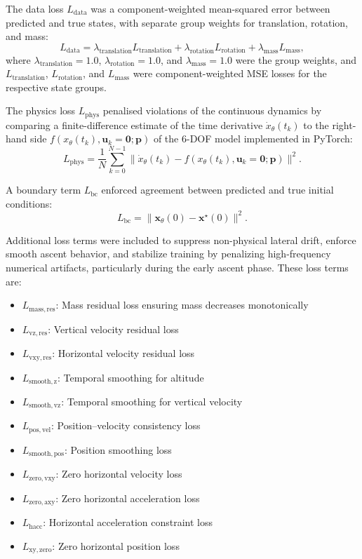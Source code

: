 The data loss \(L_\mathrm{data}\) was a component-weighted mean-squared error
between predicted and true states, with separate group weights for translation,
rotation, and mass:
\[
  L_\mathrm{data} = \lambda_\mathrm{translation} L_\mathrm{translation} +
  \lambda_\mathrm{rotation} L_\mathrm{rotation} +
  \lambda_\mathrm{mass} L_\mathrm{mass},
\]
where \(\lambda_\mathrm{translation} = 1.0\), \(\lambda_\mathrm{rotation} =
1.0\), and \(\lambda_\mathrm{mass} = 1.0\) were the group weights, and
\(L_\mathrm{translation}\), \(L_\mathrm{rotation}\), and \(L_\mathrm{mass}\) were
component-weighted MSE losses for the respective state groups.

The physics loss \(L_\mathrm{phys}\) penalised violations of the continuous
dynamics by comparing a finite-difference estimate of the time derivative
\(\dot{x}_\theta(t_k)\) to the right-hand side \(f(x_\theta(t_k), \mathbf{u}_k =
\mathbf{0}; \mathbf{p})\) of the 6-DOF model implemented in PyTorch:
\[
  L_\mathrm{phys}
  = \frac{1}{N} \sum_{k=0}^{N-1}
    \bigl\|
      \dot{x}_\theta(t_k) - f(x_\theta(t_k), \mathbf{u}_k = \mathbf{0}; \mathbf{p})
    \bigr\|^2 .
\]

A boundary term \(L_\mathrm{bc}\) enforced agreement between predicted and true
initial conditions:
\[
  L_\mathrm{bc} = \|\mathbf{x}_\theta(0) - \mathbf{x}^\star(0)\|^2.
\]

Additional loss terms were included to suppress non-physical lateral drift, enforce 
smooth ascent behavior, and stabilize training by penalizing high-frequency 
numerical artifacts, particularly during the early ascent phase. These loss terms are:
\begin{itemize}
  \item \(L_\mathrm{mass,res}\): Mass residual loss ensuring mass decreases
        monotonically
  \item \(L_\mathrm{vz,res}\): Vertical velocity residual loss
  \item \(L_\mathrm{vxy,res}\): Horizontal velocity residual loss
  \item \(L_\mathrm{smooth,z}\): Temporal smoothing for altitude
  \item \(L_\mathrm{smooth,vz}\): Temporal smoothing for vertical velocity
  \item \(L_\mathrm{pos,vel}\): Position--velocity consistency loss
  \item \(L_\mathrm{smooth,pos}\): Position smoothing loss
  \item \(L_\mathrm{zero,vxy}\): Zero horizontal velocity loss
  \item \(L_\mathrm{zero,axy}\): Zero horizontal acceleration loss
  \item \(L_\mathrm{hacc}\): Horizontal acceleration constraint loss
  \item \(L_\mathrm{xy,zero}\): Zero horizontal position loss
\end{itemize}

